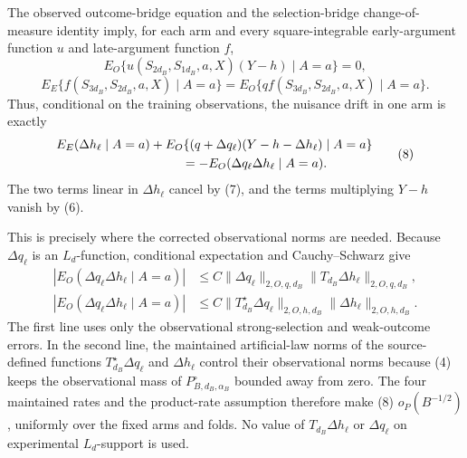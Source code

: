The observed outcome-bridge equation and the selection-bridge change-of-measure identity imply, for each arm and every square-integrable early-argument function \(u\) and late-argument function \(f\),
\[
 E_O\{u(S_{2d_B},S_{1d_B},a,X)(Y-h)\mid A=a\}=0,              \tag{6}
\]
\[
 E_E\{f(S_{3d_B},S_{2d_B},a,X)\mid A=a\}
 =E_O\{qf(S_{3d_B},S_{2d_B},a,X)\mid A=a\}.                  \tag{7}
\]
Thus, conditional on the training observations, the nuisance drift in one arm is exactly
\[
\begin{aligned}
 &E_E(\Delta h_\ell\mid A=a)
 +E_O\{(q+\Delta q_\ell)(Y-h-\Delta h_\ell)\mid A=a\}\\
 &\hspace{35mm}=-E_O(\Delta q_\ell\Delta h_\ell\mid A=a).
\end{aligned}                                                   \tag{8}
\]
The two terms linear in \(\Delta h_\ell\) cancel by (7), and the terms multiplying \(Y-h\) vanish by (6).

This is precisely where the corrected observational norms are needed.  Because \(\Delta q_\ell\) is an \(L_d\)-function, conditional expectation and Cauchy--Schwarz give
\[
\begin{aligned}
 |E_O(\Delta q_\ell\Delta h_\ell\mid A=a)|
 &\le C\|\Delta q_\ell\|_{2,O,q,d_B}
          \|T_{d_B}\Delta h_\ell\|_{2,O,q,d_B},\\
 |E_O(\Delta q_\ell\Delta h_\ell\mid A=a)|
 &\le C\|T_{d_B}^{\star}\Delta q_\ell\|_{2,O,h,d_B}
          \|\Delta h_\ell\|_{2,O,h,d_B}.
\end{aligned}                                                   \tag{9}
\]
The first line uses only the observational strong-selection and weak-outcome errors.  In the second line, the maintained artificial-law norms of the source-defined functions \(T_{d_B}^{\star}\Delta q_\ell\) and \(\Delta h_\ell\) control their observational norms because (4) keeps the observational mass of \(P_{B,d_B,\alpha_B}^{\circ}\) bounded away from zero.  The four maintained rates and the product-rate assumption therefore make (8) \(o_P(B^{-1/2})\), uniformly over the fixed arms and folds.  No value of \(T_{d_B}\Delta h_\ell\) or \(\Delta q_\ell\) on experimental \(L_d\)-support is used.

